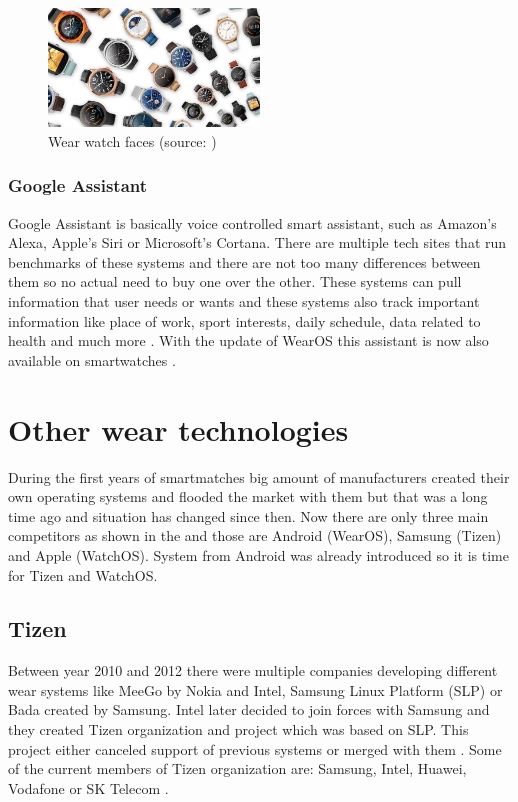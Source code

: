 \begin{figure}[H]
	\begin{centering}
		\includegraphics[width=0.5\textwidth]{img/wear_watch_faces}
		\par\end{centering}
	\caption{Wear watch faces (source: \cite{AW2UG})\label{fig:WearWatchFaces}}
	\label{fig04c04}
\end{figure}

\subsubsection{Google Assistant}\label{sec:GoogleAssistant}
Google Assistant is basically voice controlled smart assistant, such as Amazon's Alexa, Apple's Siri or Microsoft's Cortana. There are multiple tech sites that run benchmarks of these systems \cite{ASGA, VACCGASAB, CAGACS, GASBAC} and there are not too many differences between them so no actual need to buy one over the other. These systems can pull information that user needs or wants and these systems also track important information like place of work, sport interests, daily schedule, data related to health and much more \cite{WIGA}. With the update of WearOS this assistant is now also available on smartwatches \cite{AW2UG, AW2WN}.

\section{Other wear technologies}\label{sec:OtherWearTechnologies}
During the first years of smartmatches big amount of manufacturers created their own operating systems and flooded the market with them but that was a long time ago and situation has changed since then. Now there are only three main competitors as shown in the  and those are Android (WearOS), Samsung (Tizen) and Apple (WatchOS). System from Android was already introduced so it is time for Tizen and WatchOS.

\subsection{Tizen}\label{sec:Tizen}
Between year 2010 and 2012 there were multiple companies developing different wear systems like MeeGo by Nokia and Intel, Samsung Linux Platform (SLP) or Bada created by Samsung. Intel later decided to join forces with Samsung and they created Tizen organization and project which was based on SLP. This project either canceled support of previous systems or merged with them \cite{TOSBHR}. Some of the current members of Tizen organization are: Samsung, Intel, Huawei, Vodafone or SK Telecom \cite{TizenM}.

